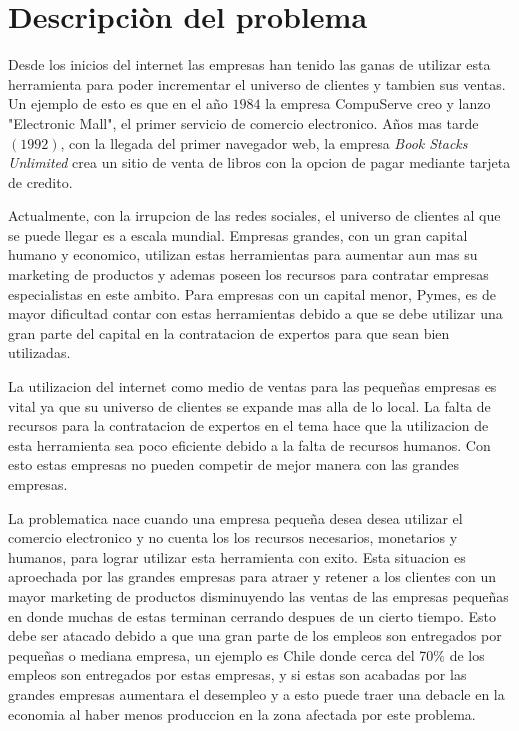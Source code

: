 \section{Descripciòn del problema}




Desde los inicios del internet las empresas han tenido las ganas de utilizar esta herramienta para poder 
incrementar el universo de clientes y tambien sus ventas. Un ejemplo de esto es que en el año $1984$ 
la empresa CompuServe creo y lanzo "Electronic Mall", el primer servicio de comercio electronico\cite{Def:1}. 
Años mas tarde$(1992)$, con la llegada del primer navegador web, la empresa \emph{Book Stacks Unlimited}
 crea un sitio de venta de libros con la opcion de pagar mediante tarjeta de credito.

Actualmente, con la irrupcion de las redes sociales, el universo de clientes al que se puede llegar es a escala 
mundial. Empresas grandes, con un gran capital humano y economico, utilizan estas herramientas para aumentar
aun mas su marketing de productos y ademas poseen los recursos para contratar empresas especialistas en este
ambito. Para empresas con un capital menor, Pymes, es de mayor dificultad contar con estas herramientas debido
a que se debe utilizar una gran parte del capital en la contratacion de expertos para que sean bien utilizadas.

La utilizacion del internet como medio de ventas para las pequeñas empresas es vital ya que su universo de clientes
se expande mas alla de lo local. La falta de recursos para la contratacion de expertos en el tema hace que la 
utilizacion de esta herramienta sea poco eficiente debido a la falta de recursos humanos. Con esto estas empresas
no pueden competir de mejor manera con las grandes empresas.

La problematica nace cuando una empresa pequeña desea desea utilizar el comercio electronico y no cuenta 
los los recursos necesarios, monetarios y humanos, para lograr utilizar esta herramienta con exito. Esta situacion
es aproechada por las grandes empresas para atraer y retener a los clientes con un mayor marketing de productos 
disminuyendo las ventas de las empresas pequeñas en donde muchas de estas terminan cerrando despues de un cierto tiempo.
Esto debe ser atacado debido a que una gran parte de los empleos son entregados por pequeñas o mediana empresa,
un ejemplo es Chile donde cerca del 70$\%$ de los empleos son entregados por estas empresas, y si estas son
acabadas por las grandes empresas aumentara el desempleo y a esto puede traer una debacle en la economia al haber menos
 produccion en la zona afectada por este problema.

